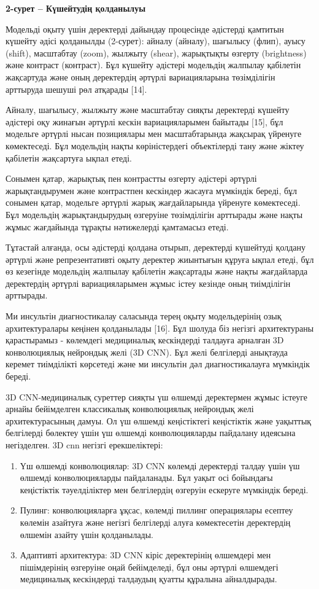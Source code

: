 \textbf{2-сурет -- Күшейтудің қолданылуы}

Модельді оқыту үшін деректерді дайындау процесінде әдістерді қамтитын
күшейту әдісі қолданылды (2-сурет): айналу (айналу), шағылысу (флип),
ауысу (shift), масштабтау (zoom), жылжыту (shear), жарықтықты өзгерту
(brightness) және контраст (контраст). Бұл күшейту әдістері модельдің
жалпылау қабілетін жақсартуда және оның деректердің әртүрлі
вариацияларына төзімділігін арттыруда шешуші рөл атқарады {[}14{]}.

Айналу, шағылысу, жылжыту және масштабтау сияқты деректерді күшейту
әдістері оқу жинағын әртүрлі кескін вариацияларымен байытады {[}15{]},
бұл модельге әртүрлі нысан позициялары мен масштабтарында жақсырақ
үйренуге көмектеседі. Бұл модельдің нақты көріністердегі объектілерді
тану және жіктеу қабілетін жақсартуға ықпал етеді.

Сонымен қатар, жарықтық пен контрастты өзгерту әдістері әртүрлі
жарықтандырумен және контрастпен кескіндер жасауға мүмкіндік береді, бұл
сонымен қатар, модельге әртүрлі жарық жағдайларында үйренуге
көмектеседі. Бұл модельдің жарықтандырудың өзгеруіне төзімділігін
арттырады және нақты жұмыс жағдайында тұрақты нәтижелерді қамтамасыз
етеді.

Тұтастай алғанда, осы әдістерді қолдана отырып, деректерді күшейтуді
қолдану әртүрлі және репрезентативті оқыту деректер жиынтығын құруға
ықпал етеді, бұл өз кезегінде модельдің жалпылау қабілетін жақсартады
және нақты жағдайларда деректердің әртүрлі вариацияларымен жұмыс істеу
кезінде оның тиімділігін арттырады.

Ми инсультін диагностикалау саласында терең оқыту модельдерінің озық
архитектуралары кеңінен қолданылады {[}16{]}. Бұл шолуда біз негізгі
архитектураны қарастырамыз - көлемдегі медициналық кескіндерді талдауға
арналған 3D конволюциялық нейрондық желі (3D CNN). Бұл желі белгілерді
анықтауда керемет тиімділікті көрсетеді және ми инсультін дәл
диагностикалауға мүмкіндік береді.

3D CNN-медициналық суреттер сияқты үш өлшемді деректермен жұмыс істеуге
арнайы бейімделген классикалық конволюциялық нейрондық желі
архитектурасының дамуы. Ол үш өлшемді кеңістіктегі кеңістіктік және
уақыттық белгілерді бөлектеу үшін үш өлшемді конволюцияларды пайдалану
идеясына негізделген. 3D cnn негізгі ерекшеліктері:

\begin{enumerate}
\def\labelenumi{\arabic{enumi}.}
\item
  Үш өлшемді конволюциялар: 3D CNN көлемді деректерді талдау үшін үш
  өлшемді конволюцияларды пайдаланады. Бұл уақыт осі бойындағы
  кеңістіктік тәуелділіктер мен белгілердің өзгеруін ескеруге мүмкіндік
  береді.
\item
  Пулинг: конволюцияларға ұқсас, көлемді пиллинг операциялары есептеу
  көлемін азайтуға және негізгі белгілерді алуға көмектесетін
  деректердің өлшемін азайту үшін қолданылады.
\item
  Адаптивті архитектура: 3D CNN кіріс деректерінің өлшемдері мен
  пішімдерінің өзгеруіне оңай бейімделеді, бұл оны әртүрлі өлшемдегі
  медициналық кескіндерді талдаудың қуатты құралына айналдырады.
\end{enumerate}

